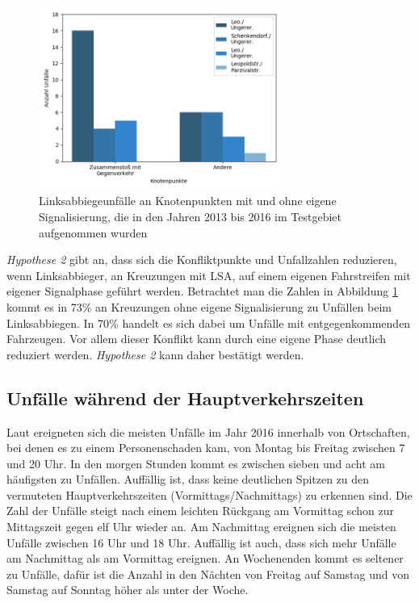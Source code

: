 \begin{savenotes}
	\begin{figure}[H]
		\centering
		\includegraphics[width=8cm,height=6cm]{figures/Unfaelle_Signalphasen}
		\caption[Linksabbiegeunfälle an Knotenpunkten mit und ohne eigene Signalisierung, die in den Jahren 2013 bis 2016 im Testgebiet aufgenommen wurden]{Linksabbiegeunfälle an Knotenpunkten mit und ohne eigene Signalisierung, die in den Jahren 2013 bis 2016 im Testgebiet aufgenommen wurden}\label{fig:Unfaelle_Signalphasen}
	\end{figure}
\end{savenotes}

\textit{Hypothese 2} gibt an, dass sich die Konfliktpunkte und Unfallzahlen reduzieren, wenn Linksabbieger, an Kreuzungen mit LSA, auf einem eigenen Fahrstreifen mit eigener Signalphase geführt werden. Betrachtet man die Zahlen in Abbildung \ref{fig:Unfaelle_Signalphasen} kommt es in 73\% an Kreuzungen ohne eigene Signalisierung zu Unfällen beim Linksabbiegen. In 70\% handelt es sich dabei um Unfälle mit entgegenkommenden Fahrzeugen. Vor allem dieser Konflikt kann durch eine eigene Phase deutlich reduziert werden. \textit{Hypothese 2} kann daher bestätigt werden.

\subsection{Unfälle während der Hauptverkehrszeiten}
Laut \Textcite[S.80-81]{StatistischesBundesamt.2017} ereigneten sich die meisten Unfälle im Jahr 2016 innerhalb von Ortschaften, bei denen es zu einem Personenschaden kam, von Montag bis Freitag zwischen 7 und 20 Uhr. In den morgen Stunden kommt es zwischen sieben und acht am häufigsten zu Unfällen. Auffällig ist, dass keine deutlichen Spitzen zu den vermuteten Hauptverkehrszeiten (Vormittags/Nachmittags) zu erkennen sind.  Die Zahl der Unfälle steigt nach einem leichten Rückgang am Vormittag schon zur Mittagszeit gegen elf Uhr wieder an. Am Nachmittag ereignen sich die meisten Unfälle zwischen 16 Uhr und 18 Uhr. Auffällig ist auch, dass sich mehr Unfälle am Nachmittag als am Vormittag ereignen. An Wochenenden kommt es seltener zu Unfälle, dafür ist die Anzahl in den Nächten von Freitag auf Samstag und von Samstag auf Sonntag höher als unter der Woche.

